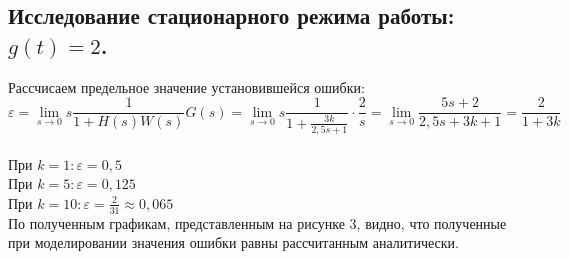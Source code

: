 \documentclass[a4paper, 11pt, russian]{article}
\begin{document}
    \subsection{Исследование стационарного режима работы: $g(t) = 2$.}
    Рассчисаем предельное значение установившейся ошибки: $$\varepsilon = \lim_{s\to0} s\frac{1}{1 + H(s)W(s)}G(s) = \lim_{s\to0} s\frac{1}{1 + \frac{3k}{2,5s + 1}}\cdot\frac{2}{s} = \lim_{s\to0} \frac{5s + 2}{2,5s + 3k + 1} = \frac{2}{1 + 3k}$$\\
    При $k = 1: \varepsilon = 0,5$\\
    При $k = 5: \varepsilon = 0,125$\\
    При $k = 10: \varepsilon = \displaystyle{\frac{2}{31}} \approx 0,065$\\
    
    По полученным графикам, представленным на рисунке 3, видно, что полученные при моделировании значения ошибки равны рассчитанным аналитически.\\
\end{document}
